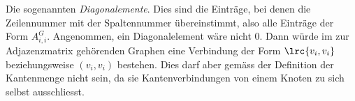 \begin{myanswer}[myexercise:0301]
	Die sogenannten \textit{Diagonalemente}. Dies sind die Einträge, bei denen die Zeilennummer mit der Spaltennummer übereinstimmt, also alle Einträge der Form $A^G_{i,i}$. Angenommen, ein Diagonalelement wäre nicht 0. Dann würde im zur Adjazenzmatrix gehörenden Graphen eine Verbindung der Form $\lrc{v_i,v_i}$ beziehungsweise $(v_i,v_i)$ bestehen. Dies darf aber gemäss der Definition der Kantenmenge nicht sein, da sie Kantenverbindungen von einem Knoten zu sich selbst ausschliesst.
\end{myanswer}
